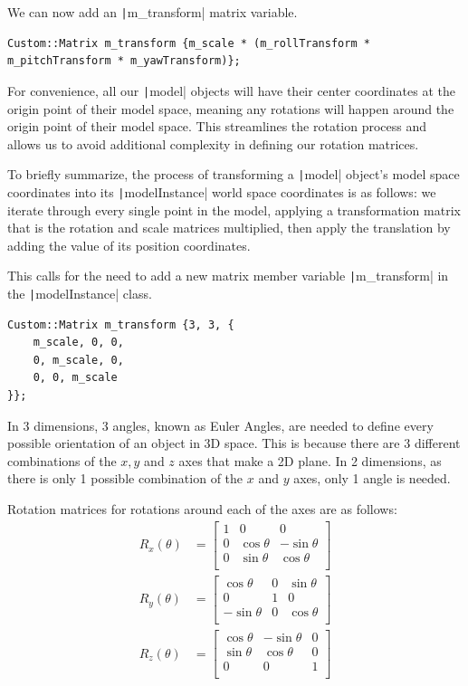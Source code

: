 \documentclass[a4paper]{article}
\newenvironment{code}{\captionsetup{type=listing}}{}
\begin{document}
We can now add an \texttt|m_transform| matrix variable.
\begin{code}
    \begin{verbatim}
Custom::Matrix m_transform {m_scale * (m_rollTransform * m_pitchTransform * m_yawTransform)};
    \end{verbatim}
\end{code}

For convenience, all our \texttt|model| objects will have their center coordinates at the origin point of their model space, meaning any rotations will happen around the origin point of their model space. This streamlines the rotation process and allows us to avoid additional complexity in defining our rotation matrices.

To briefly summarize, the process of transforming a \texttt|model| object's model space coordinates into its \texttt|modelInstance| world space coordinates is as follows: we iterate through every single point in the model, applying a transformation matrix that is the rotation and scale matrices multiplied, then apply the translation by adding the value of its position coordinates.

This calls for the need to add a new matrix member variable \texttt|m_transform| in the \texttt|modelInstance| class.
\begin{code}
    \begin{verbatim}
Custom::Matrix m_transform {3, 3, {
    m_scale, 0, 0,
    0, m_scale, 0,
    0, 0, m_scale
}};
    \end{verbatim}
\end{code}
In 3 dimensions, 3 angles, known as Euler Angles, are needed to define every possible orientation of an object in 3D space. This is because there are 3 different combinations of the $x, y$ and $z$ axes that make a 2D plane. In 2 dimensions, as there is only 1 possible combination of the $x$ and $y$ axes, only 1 angle is needed.

Rotation matrices for rotations around each of the axes are as follows:
\[
{\displaystyle {\begin{alignedat}{1}R_{x}(\theta )&={\begin{bmatrix}1&0&0\\0&\cos \theta &-\sin \theta \\[3pt]0&\sin \theta &\cos \theta \\[3pt]\end{bmatrix}}\\[6pt]R_{y}(\theta )&={\begin{bmatrix}\cos \theta &0&\sin \theta \\[3pt]0&1&0\\[3pt]-\sin \theta &0&\cos \theta \\\end{bmatrix}}\\[6pt]R_{z}(\theta )&={\begin{bmatrix}\cos \theta &-\sin \theta &0\\[3pt]\sin \theta &\cos \theta &0\\[3pt]0&0&1\\\end{bmatrix}}\end{alignedat}}}
\]
\end{document}
